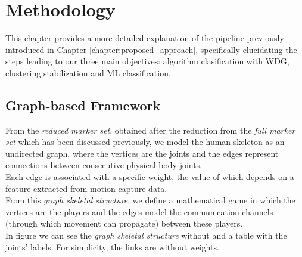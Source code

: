 \chapter{Methodology}
\label{chapter:methodology}
This chapter provides a more detailed explanation of the pipeline previously introduced in Chapter \ref{chapter:proposed_approach}, specifically elucidating the steps leading to our three main objectives: algorithm clasification with WDG, clustering stabilization and ML classification.


\section{Graph-based Framework}
\label{sec:graph_method}
From the \textit{reduced marker set}, obtained after the reduction from the \textit{full marker set} which has been discussed previously, we model the human skeleton as an undirected graph, where the vertices are the joints and the edges represent connections between consecutive physical body joints.\\
Each edge is associated with a specific weight, the value of which depends on a feature extracted from motion capture data. \\
From this \textit{graph skeletal structure}, we define a mathematical game in which the vertices are the players and the edges model the communication channels (through which movement can propagate) between these players. \\
In figure we can see the \textit{graph skeletal structure} without and a table with the joints' labels.
For simplicity, the links are without weights.


